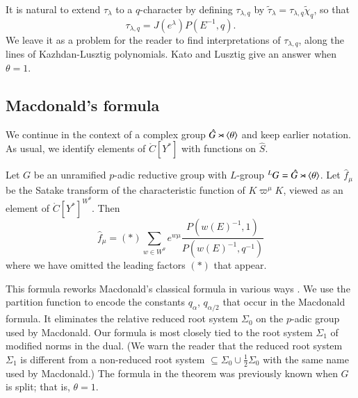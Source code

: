 It is natural to extend $\tau_\lambda$ to a $q$-character by defining $\tau_{\lambda,q}$ by
$\tilde \tau_\lambda = \tau_{\lambda,q} \tilde \chi_q$, so that
\[
\tau_{\lambda,q} = J(e^\lambda) P(E^{-1},q).
\]
We leave it as a problem for the reader to find interpretations of $\tau_{\lambda,q}$, along the lines of Kazhdan-Lusztig
polynomials.  Kato and Lusztig give an answer when $\theta=1$.


\subsection{Macdonald's formula}\label{sec:macdonald}


We continue in the context of a complex group $\hat G \rtimes \langle{\theta}\rangle$ and keep earlier notation.
As usual, we identify elements of $\ring{C}[Y^*]$ with functions on $\hat S$.  

\begin{theorem}
Let $G$ be an unramified $p$-adic reductive group with $L$-group ${}^LG = \hat G \rtimes \langle{\theta}\rangle$.
Let $\hat f_\mu$ be the Satake transform of the characteristic function of $K\varpi^\mu K$, viewed as an element
of $\ring{C}[Y^*]^{W^\theta}$.  Then
\[
\hat f_\mu = (*) \sum_{w\in W^\theta} e^{w\mu} \frac{P(w(E)^{-1},1)}{P(w(E)^{-1},q^{-1})}
\]
where we have omitted the leading factors $(*)$ that appear.
\end{theorem}

This formula reworks Macdonald's classical formula in various ways \cite{macdonaldspherical}.
We use the partition function to
encode the constants $q_\alpha$, $q_{\alpha/2}$ that occur in the Macdonald formula.  It eliminates
the relative reduced root system $\Sigma_0$ on the $p$-adic group used by Macdonald.  Our formula is most closely
tied to the root system $\Sigma_1$ of modified norms in the dual. (We warn the reader that the reduced root system $\Sigma_1$
is different from a non-reduced root system $\subseteq \Sigma_0 \cup \frac{1}{2}\Sigma_0$ 
with the same name used by Macdonald.)
The formula in the theorem was previously known when $G$ is split; that is, $\theta=1$.

